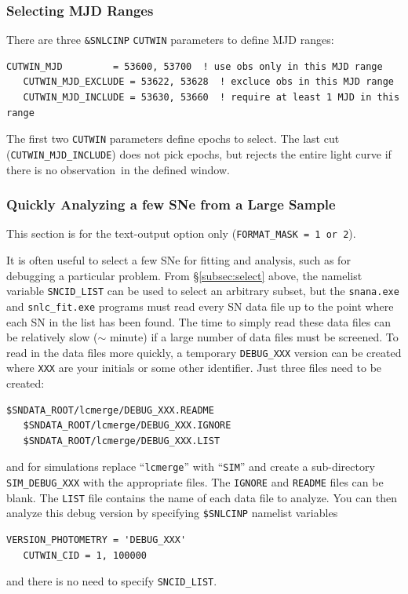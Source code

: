\documentclass[12pt]{article}
\newcommand{\obs}{observation}
\begin{document}
\subsubsection{Selecting MJD Ranges}

There are three {\tt \&SNLCINP} {\tt CUTWIN} parameters to define
MJD ranges:
\begin{Verbatim}[frame=single]
   CUTWIN_MJD         = 53600, 53700  ! use obs only in this MJD range
   CUTWIN_MJD_EXCLUDE = 53622, 53628  ! excluce obs in this MJD range
   CUTWIN_MJD_INCLUDE = 53630, 53660  ! require at least 1 MJD in this range
\end{Verbatim}
The first two {\tt CUTWIN} parameters define epochs to select.
The last cut ({\tt CUTWIN\_MJD\_INCLUDE}) does not pick epochs,
but rejects the entire light curve if there is no \obs\ in the
defined window.

   \subsubsection{Quickly Analyzing a few SNe from a Large Sample}
   \label{subsec:quickAnal}

This section is for the text-output option only
({\tt FORMAT\_MASK = 1 or 2}).

It is often useful to select a few SNe for fitting and analysis, 
such as for debugging a particular problem. 
From \S\ref{subsec:select} above, the namelist variable
{\tt SNCID\_LIST} can be used to select an arbitrary subset,
but the {\tt snana.exe} and {\tt snlc\_fit.exe} programs
must read every SN data file up to the point where
each SN in the list has been found. The time to simply 
read these data files can be relatively slow ($\sim$ minute)
if a large number of data files must be screened.
To read in the data files more quickly,
a temporary {\tt DEBUG\_XXX} version
can be created where {\tt XXX} are your initials or some other
identifier. Just three files need to be created:
%
\begin{Verbatim}[frame=single]
   $SNDATA_ROOT/lcmerge/DEBUG_XXX.README
   $SNDATA_ROOT/lcmerge/DEBUG_XXX.IGNORE
   $SNDATA_ROOT/lcmerge/DEBUG_XXX.LIST
\end{Verbatim}
%
and for simulations replace ``{\tt lcmerge}''
with ``{\tt SIM}'' and create a sub-directory {\tt SIM\_DEBUG\_XXX}
with the appropriate files.
The {\tt IGNORE} and {\tt README} files can be blank.
The {\tt LIST} file contains the name of each data file
to analyze. You can then analyze this debug version by
specifying {\tt \$SNLCINP} namelist variables
\begin{Verbatim}[frame=single]
   VERSION_PHOTOMETRY = 'DEBUG_XXX'
   CUTWIN_CID = 1, 100000
\end{Verbatim}
%
and there is no need to specify {\tt SNCID\_LIST}.
\end{document}
